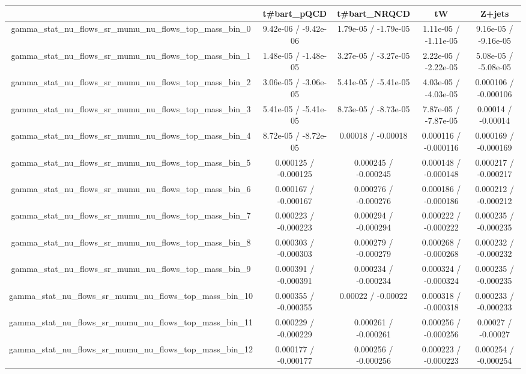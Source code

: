 \documentclass[10pt]{article}
\begin{document}
\begin{table}[htbp]
\begin{center}
\begin{tabular}{|c|c|c|c|c|}
\hline 
      & t#bar{t}_{pQCD}      & t#bar{t}_{NRQCD}      & tW      & Z+jets \\ 
\hline 
  gamma_stat_nu_flows_sr_mumu_nu_flows_top_mass_bin_0 & 9.42e-06 / -9.42e-06 & 1.79e-05 / -1.79e-05 & 1.11e-05 / -1.11e-05 & 9.16e-05 / -9.16e-05 \\ 
  gamma_stat_nu_flows_sr_mumu_nu_flows_top_mass_bin_1 & 1.48e-05 / -1.48e-05 & 3.27e-05 / -3.27e-05 & 2.22e-05 / -2.22e-05 & 5.08e-05 / -5.08e-05 \\ 
  gamma_stat_nu_flows_sr_mumu_nu_flows_top_mass_bin_2 & 3.06e-05 / -3.06e-05 & 5.41e-05 / -5.41e-05 & 4.03e-05 / -4.03e-05 & 0.000106 / -0.000106 \\ 
  gamma_stat_nu_flows_sr_mumu_nu_flows_top_mass_bin_3 & 5.41e-05 / -5.41e-05 & 8.73e-05 / -8.73e-05 & 7.87e-05 / -7.87e-05 & 0.00014 / -0.00014 \\ 
  gamma_stat_nu_flows_sr_mumu_nu_flows_top_mass_bin_4 & 8.72e-05 / -8.72e-05 & 0.00018 / -0.00018 & 0.000116 / -0.000116 & 0.000169 / -0.000169 \\ 
  gamma_stat_nu_flows_sr_mumu_nu_flows_top_mass_bin_5 & 0.000125 / -0.000125 & 0.000245 / -0.000245 & 0.000148 / -0.000148 & 0.000217 / -0.000217 \\ 
  gamma_stat_nu_flows_sr_mumu_nu_flows_top_mass_bin_6 & 0.000167 / -0.000167 & 0.000276 / -0.000276 & 0.000186 / -0.000186 & 0.000212 / -0.000212 \\ 
  gamma_stat_nu_flows_sr_mumu_nu_flows_top_mass_bin_7 & 0.000223 / -0.000223 & 0.000294 / -0.000294 & 0.000222 / -0.000222 & 0.000235 / -0.000235 \\ 
  gamma_stat_nu_flows_sr_mumu_nu_flows_top_mass_bin_8 & 0.000303 / -0.000303 & 0.000279 / -0.000279 & 0.000268 / -0.000268 & 0.000232 / -0.000232 \\ 
  gamma_stat_nu_flows_sr_mumu_nu_flows_top_mass_bin_9 & 0.000391 / -0.000391 & 0.000234 / -0.000234 & 0.000324 / -0.000324 & 0.000235 / -0.000235 \\ 
  gamma_stat_nu_flows_sr_mumu_nu_flows_top_mass_bin_10 & 0.000355 / -0.000355 & 0.00022 / -0.00022 & 0.000318 / -0.000318 & 0.000233 / -0.000233 \\ 
  gamma_stat_nu_flows_sr_mumu_nu_flows_top_mass_bin_11 & 0.000229 / -0.000229 & 0.000261 / -0.000261 & 0.000256 / -0.000256 & 0.00027 / -0.00027 \\ 
  gamma_stat_nu_flows_sr_mumu_nu_flows_top_mass_bin_12 & 0.000177 / -0.000177 & 0.000256 / -0.000256 & 0.000223 / -0.000223 & 0.000254 / -0.000254 \\ 

\end{tabular}
\end{center}
\end{table}
\end{document}
